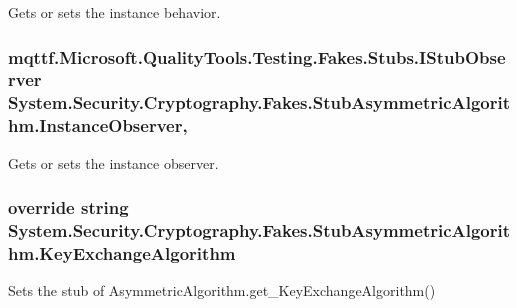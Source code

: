 Gets or sets the instance behavior.

\hypertarget{class_system_1_1_security_1_1_cryptography_1_1_fakes_1_1_stub_asymmetric_algorithm_a5038156da1baa0f5640aa39ae26e4123}{
\subsubsection[{Instance\-Observer}]{\setlength{\rightskip}{0pt plus 5cm}mqttf.\-Microsoft.\-Quality\-Tools.\-Testing.\-Fakes.\-Stubs.\-I\-Stub\-Observer System.\-Security.\-Cryptography.\-Fakes.\-Stub\-Asymmetric\-Algorithm.\-Instance\-Observer\hspace{0.3cm}{\ttfamily [get]}, {\ttfamily [set]}}}\label{class_system_1_1_security_1_1_cryptography_1_1_fakes_1_1_stub_asymmetric_algorithm_a5038156da1baa0f5640aa39ae26e4123}


Gets or sets the instance observer.

\hypertarget{class_system_1_1_security_1_1_cryptography_1_1_fakes_1_1_stub_asymmetric_algorithm_a691833ef97b25a0bb27b4a2e0fe652dd}{
\subsubsection[{Key\-Exchange\-Algorithm}]{\setlength{\rightskip}{0pt plus 5cm}override string System.\-Security.\-Cryptography.\-Fakes.\-Stub\-Asymmetric\-Algorithm.\-Key\-Exchange\-Algorithm\hspace{0.3cm}{\ttfamily [get]}}}\label{class_system_1_1_security_1_1_cryptography_1_1_fakes_1_1_stub_asymmetric_algorithm_a691833ef97b25a0bb27b4a2e0fe652dd}


Sets the stub of Asymmetric\-Algorithm.\-get\-\_\-\-Key\-Exchange\-Algorithm()

